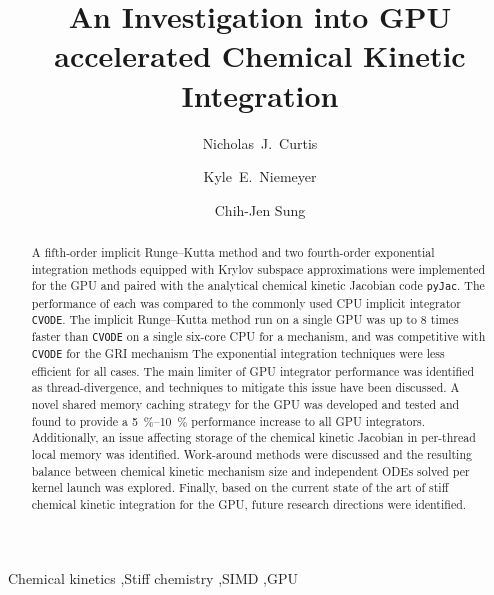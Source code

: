 \documentclass[preprint]{elsarticle}
\begin{document}
\begin{frontmatter}

\title{An Investigation into GPU accelerated Chemical Kinetic Integration}

\author[uconn]{Nicholas~J.\ Curtis}
\author[osu]{Kyle~E.\ Niemeyer}
\author[uconn]{Chih-Jen Sung}

\address[uconn]{Department of Mechanical Engineering\\
  University of Connecticut, Storrs, CT, 06269, USA}
\address[osu]{School of Mechanical, Industrial, and Manufacturing Engineering\\
  Oregon State University, Corvallis, OR 97331, USA}
  

\begin{abstract}
A fifth-order implicit Runge--Kutta method and two fourth-order exponential integration methods equipped with Krylov subspace approximations were implemented for the GPU and paired with the analytical chemical kinetic Jacobian code \texttt{pyJac}.
The performance of each was compared to the commonly used CPU implicit integrator \texttt{CVODE}.
The implicit Runge--Kutta method run on a single GPU was up to 8 times faster than \texttt{CVODE} on a single six-core CPU for a  mechanism, and was competitive with \texttt{CVODE} for the GRI mechanism
The exponential integration techniques were less efficient for all cases.
The main limiter of GPU integrator performance was identified as thread-divergence, and techniques to mitigate this issue have been discussed.
A novel shared memory caching strategy for the GPU was developed and tested and found to provide a \SIrange{5}{10}{\percent} performance increase to all GPU integrators.
Additionally, an issue affecting storage of the chemical kinetic Jacobian in per-thread local memory was identified.
Work-around methods were discussed and the resulting balance between chemical kinetic mechanism size and independent ODEs solved per kernel launch was explored.
Finally, based on the current state of the art of stiff chemical kinetic integration for the GPU, future research directions were identified.
\end{abstract}

\begin{keyword}
 Chemical kinetics \sep Stiff chemistry \sep SIMD \sep GPU
\end{keyword}

\end{frontmatter}
\pagebreak
\end{document}
